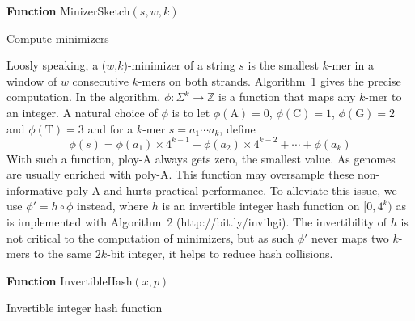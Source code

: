\documentclass{bioinfo}
\begin{document}
\begin{methods}
\begin{algorithm}[ht]
\DontPrintSemicolon
\footnotesize
{}
\BlankLine
\textbf{Function} {\sc MinizerSketch}$(s,w,k)$
\caption{Compute minimizers}
\end{algorithm}

Loosly speaking, a ($w$,$k$)-minimizer of a string $s$ is the smallest $k$-mer
in a window of $w$ consecutive $k$-mers on both strands. Algorithm~1 gives the
precise computation. In the algorithm, $\phi:\Sigma^k\to\mathbb{Z}$ is a
function that maps any $k$-mer to an integer.  A natural choice of $\phi$ is to
let $\phi(\mathrm{A})=0$, $\phi(\mathrm{C})=1$, $\phi(\mathrm{G})=2$ and
$\phi(\mathrm{T})=3$ and for a $k$-mer $s=a_1\cdots a_k$, define
$$
\phi(s)=\phi(a_1)\times4^{k-1}+\phi(a_2)\times4^{k-2}+\cdots+\phi(a_k)
$$
With such a function, ploy-A always gets zero, the smallest value.  As genomes
are usually enriched with poly-A. This function may oversample these
non-informative poly-A and hurts practical performance. To alleviate this
issue, we use $\phi'=h\circ\phi$ instead, where $h$ is an invertible integer
hash function on $[0,4^k)$ as is implemented with Algorithm~2
(http://bit.ly/invihgi). The invertibility of $h$ is not critical to the
computation of minimizers, but as such $\phi'$ never maps two $k$-mers to the
same $2k$-bit integer, it helps to reduce hash collisions.

\begin{algorithm}[ht]
\DontPrintSemicolon
\footnotesize
{}
\BlankLine
\textbf{Function} {\sc InvertibleHash}$(x,p)$
\caption{Invertible integer hash function}
\end{algorithm}


\end{methods}
\end{document}
